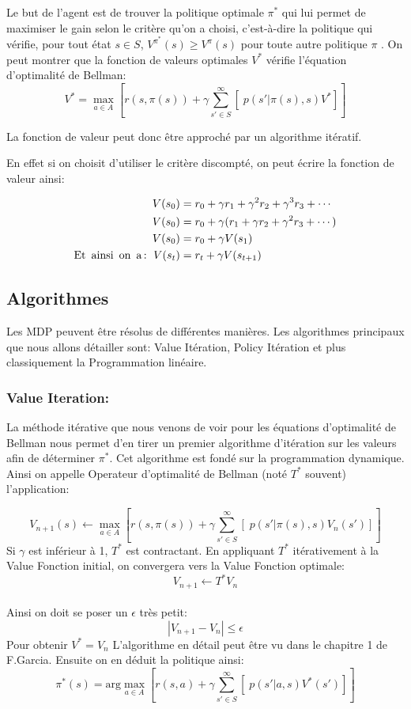 \documentclass{article}
\begin{document}
\noindent Le but de l'agent est de trouver la politique optimale $\pi^*$ qui lui permet de maximiser le gain selon le critère qu'on a choisi, c'est-à-dire la politique qui vérifie, pour tout état $s\in S$, $ V^{\pi ^{*}} (s) \geq V^{\pi } (s) $ pour toute autre politique $\pi$ . On peut montrer que la fonction de valeurs optimales $ V^{*}$ vérifie l'équation d'optimalité de Bellman:
$$ V^{*} = \max_{a \in A} [  r(s,\pi(s)) + \gamma \sum_{s' \in S}^{\infty} [ \; p(s'|\pi(s),s)  V^{*}  ] ]$$

La fonction de valeur peut donc être approché par un algorithme itératif. 

En effet si on choisit d'utiliser le critère discompté, on peut écrire la fonction de valeur ainsi:

\begin{align*}
V(s_0) &= r_0 + \gamma r_1 + \gamma^2 r_2 + \gamma^3 r_3  +\cdots \\
V(s_0) &= r_0 + \gamma (r_1 + \gamma r_2 + \gamma^2 r_3  +\cdots ) \\
V(s_0) &= r_0 + \gamma V(s_1)\\
\text{Et \,ainsi\, on\, a\,: \,}  V(s_t) &= r_t + \gamma V(s_{t+1}) \\
\end{align*}

\subsection{Algorithmes}

Les MDP peuvent être résolus de différentes manières. Les algorithmes principaux que nous allons détailler sont: Value Itération, Policy Itération et plus classiquement la Programmation linéaire. 

\subsubsection{Value Iteration:}
La méthode itérative que nous venons de voir pour les équations d'optimalité de Bellman nous permet d'en tirer un premier algorithme d'itération sur les valeurs  afin de déterminer $\pi^*$. Cet algorithme est fondé sur la programmation dynamique.\\

Ainsi on appelle Operateur d'optimalité de Bellman (noté $ T^*$ souvent) l'application:

$$ V_{n+1}(s) \leftarrow \max_{a \in A} [  r(s,\pi(s)) + \gamma \sum_{s' \in S}^{\infty} [ \; p(s'|\pi(s),s)  V_{n}(s')  ] ]$$
\noindent Si $\gamma$ est inférieur à 1, $T^*$ est contractant.
En appliquant $T^*$ itérativement à la Value Fonction initial, on convergera vers la Value Fonction optimale: \\ $$ V_{n+1} \leftarrow T^* V_{n} $$ \\
Ainsi on doit se poser un $\epsilon$ très petit:
$$ |V_{n+1} - V_{n} | \leq \epsilon $$
Pour obtenir $ V^*=V_n $
L'algorithme en détail peut être vu dans le chapitre 1 de F.Garcia.
Ensuite on en déduit la politique ainsi:
$$ \pi^*(s) = \text{arg}\max_{a \in A} [  r(s,a) + \gamma \sum_{s' \in S}^{\infty} [ \; p(s'|a,s)  V^*(s')  ] ]$$
\end{document}
